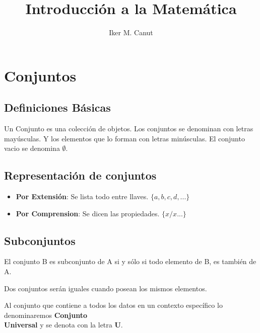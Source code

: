 \documentclass[10pt]{article}
\author{Iker M. Canut}
\begin{document}
\title{Introducción a la Matemática}
\maketitle
\date
\newpage
\section{Conjuntos}
\subsection{Definiciones Básicas}
Un Conjunto es una colección de objetos. Los conjuntos se denominan con letras mayúsculas. Y los elementos que lo forman con letras minúsculas. El conjunto vacio se denomina $\emptyset$.
\subsection{Representación de conjuntos}
\begin{itemize}
\item \textbf{Por Extensión}: Se lista todo entre llaves. $\{a,b,c,d,...\}$
\item \textbf{Por Comprension}: Se dicen las propiedades. $\{x/x...\}$
\end{itemize}
\subsection{Subconjuntos}
El conjunto B es subconjunto de A si y sólo si todo elemento de B, es también de A.
\begin{center}
\end{center}
Dos conjuntos serán iguales cuando posean los mismos elementos.
\begin{center}
\end{center}
Al conjunto que contiene a todos los datos en un contexto específico lo denominaremos \textbf{Conjunto\\ Universal} y se denota con la letra \textbf{U}.
\end{document}
